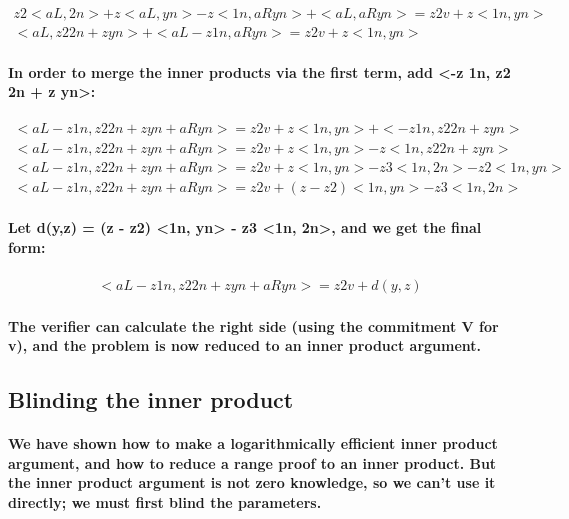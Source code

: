 \documentclass{article}
\begin{document}
\begin{eqnarray}
  z2 <aL, 2n> + z <aL, yn> - z <1n, aRyn> + <aL,  aRyn> = z2 v + z <1n, yn>\\
  <aL, z2 2n + z yn> + <aL - z 1n, aRyn> = z2 v + z <1n, yn>
\end{eqnarray}

\paragraph{In order to merge the inner products via the first term, add <-z 1n, z2 2n + z yn>:}

\begin{eqnarray}
  <aL - z 1n, z2 2n + z yn + aRyn> = z2 v + z <1n, yn> + <-z 1n, z2 2n + z yn>\\
  <aL - z 1n, z2 2n + z yn + aRyn> = z2 v + z <1n, yn> - z <1n, z2 2n + z yn>\\
  <aL - z 1n, z2 2n + z yn + aRyn> = z2 v + z <1n, yn> - z3 <1n, 2n> - z2 <1n, yn>\\
  <aL - z 1n, z2 2n + z yn + aRyn> = z2 v + (z - z2) <1n, yn> - z3 <1n, 2n>
\end{eqnarray}
  
\paragraph{Let d(y,z) = (z - z2) <1n, yn> - z3 <1n, 2n>, and we get the final form:}

\begin{eqnarray}
  <aL - z 1n, z2 2n + z yn + aRyn> = z2 v + d(y,z)
\end{eqnarray}

\paragraph{The verifier can calculate the right side (using the commitment V for v), and the problem is now reduced to an inner product argument.}


\subsection{Blinding the inner product}

\paragraph{We have shown how to make a logarithmically efficient inner product argument, and how to reduce a range proof to an inner product.  But the inner product argument is not zero knowledge, so we can’t use it directly; we must first blind the parameters.}
\end{document}
